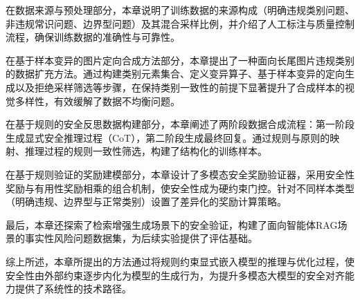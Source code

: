 在数据来源与预处理部分，本章说明了训练数据的来源构成（明确违规类别问题、非违规常识问题、边界型问题）及其混合采样比例，并介绍了人工标注与质量控制流程，确保训练数据的准确性与可靠性。

在基于样本变异的图片定向合成方法部分，本章提出了一种面向长尾图片违规类别的数据扩充方法。通过构建类别元素集合、定义变异算子、基于样本变异的定向生成以及拒绝采样筛选等步骤，在保持类别一致性的前提下显著提升了合成样本的视觉多样性，有效缓解了数据不均衡问题。

在基于规则的安全反思数据构建部分，本章阐述了两阶段数据合成流程：第一阶段生成显式安全推理过程（CoT），第二阶段生成最终回复。通过规则与原则的映射、推理过程的规则一致性筛选，构建了结构化的训练样本。

在基于规则验证的奖励建模部分，本章设计了多模态安全奖励验证器，采用安全性奖励与有用性奖励相乘的组合机制，使安全性成为硬约束门控。针对不同样本类型（明确违规、边界型与正常类别）设置了差异化的奖励计算策略。

最后，本章还探索了检索增强生成场景下的安全验证，构建了面向智能体RAG场景的事实性风险问题数据集，为后续实验提供了评估基础。

综上所述，本章所提出的方法通过将规则约束显式嵌入模型的推理与优化过程，使安全性由外部约束逐步内化为模型的生成行为，为提升多模态大模型的安全对齐能力提供了系统性的技术路径。


